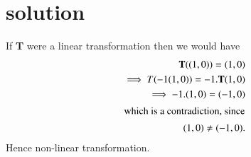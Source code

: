 \documentclass[journal,12pt,twocolumn]{IEEEtran}
\begin{document}
\section{solution}
%
  If \textbf{T} were a linear transformation then we would have
 \begin{align}
    \textbf{T}((1, 0)) = (1,0)\\ 
  \implies T( -1(1, 0))  = -1. \textbf{T}(1,0)\\
   \implies -1.(1, 0) = (-1, 0) \\
  \intertext{which is a contradiction, since}(1, 0) \neq (-1, 0).
\end{align}
  Hence non-linear transformation.
\end{document}
